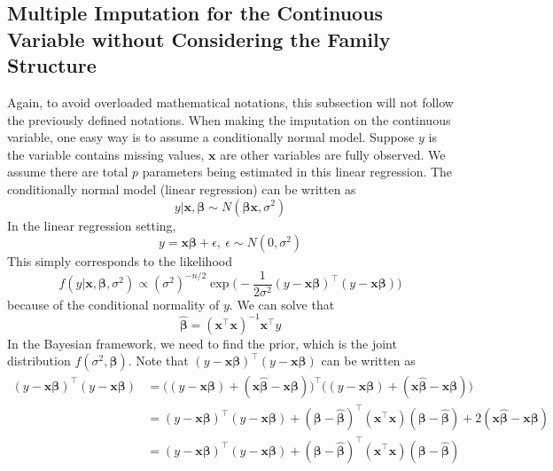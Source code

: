 \documentclass[preprint,12pt]{elsarticle}
\begin{document}
\subsection{Multiple Imputation for the Continuous Variable without Considering the Family Structure}
Again, to avoid overloaded mathematical notations, this subsection will not follow the previously defined notations. 
When making the imputation on the continuous variable, one easy way is to assume a conditionally normal model. 
Suppose $y$ is the variable contains missing values, $\mathbf{x}$ are other variables are fully observed. 
We assume there are total $p$ parameters being estimated in this linear regression. 
The conditionally normal model (linear regression) can be written as 
\begin{equation} 
    y|\mathbf{x},\boldsymbol{\beta}\sim N(\boldsymbol{\beta}\mathbf{x}, \sigma^2)
\end{equation}
In the linear regression setting, 
\begin{equation} 
    y=\mathbf{x}\boldsymbol{\beta}+\epsilon,~ \epsilon\sim N(0, \sigma^2)
\end{equation}
This simply corresponds to the likelihood 
\begin{equation}\label{eq:bayeslinearnormal}
    f(y|\mathbf{x}, \boldsymbol{\beta}, \sigma^2)\propto (\sigma^2)^{-n/2}\exp \Big (-\frac{1}{2\sigma^2} (y-\mathbf{x}\boldsymbol{\beta})^{\top}(y-\mathbf{x}\boldsymbol{\beta})\Big )
\end{equation}
because of the conditional normality of $y$. 
We can solve that 
\begin{equation} 
    \hat{\boldsymbol{\beta}}=(\mathbf{x}^{\top}\mathbf{x})^{-1}\mathbf{x}^{\top}y
\end{equation}
In the Bayesian framework, we need to find the prior, which is the joint distribution $f(\sigma^2,\boldsymbol{\beta})$. 
Note that $(y-\mathbf{x}\boldsymbol{\beta})^{\top}(y-\mathbf{x}\boldsymbol{\beta})$ can be written as 
\begin{align} 
    (y-\mathbf{x}\boldsymbol{\beta})^{\top}(y-\mathbf{x}\boldsymbol{\beta})&=\big ((y-\mathbf{x}\boldsymbol{\beta})+(\mathbf{x}\hat{\boldsymbol{\beta}}-\mathbf{x}\boldsymbol{\beta})\big )^{\top}\big ((y-\mathbf{x}\boldsymbol{\beta})+(\mathbf{x}\hat{\boldsymbol{\beta}}-\mathbf{x}\boldsymbol{\beta})\big )\\
    &=(y-\mathbf{x}\boldsymbol{\beta})^{\top}(y-\mathbf{x}\boldsymbol{\beta}) + (\boldsymbol{\beta}-\hat{\boldsymbol{\beta}})^{\top}(\mathbf{x}^{\top}\mathbf{x})(\boldsymbol{\beta}-\hat{\boldsymbol{\beta}})+2(\mathbf{x}\hat{\boldsymbol{\beta}}-\mathbf{x}\boldsymbol{\beta})\\
    &=(y-\mathbf{x}\boldsymbol{\beta})^{\top}(y-\mathbf{x}\boldsymbol{\beta}) + (\boldsymbol{\beta}-\hat{\boldsymbol{\beta}})^{\top}(\mathbf{x}^{\top}\mathbf{x})(\boldsymbol{\beta}-\hat{\boldsymbol{\beta}})
\end{align}
\end{document}
